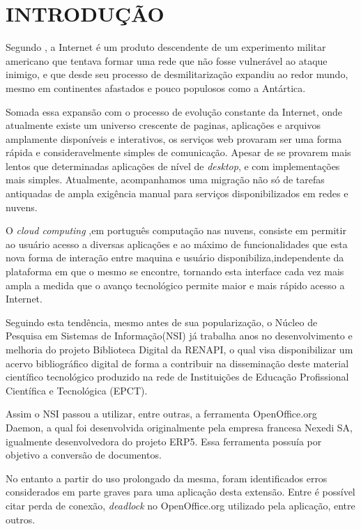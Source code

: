 \chapter{INTRODUÇÃO}

Segundo \cite{TESLA}, a Internet é um produto descendente de um experimento militar americano que tentava formar uma rede que não fosse vulnerável ao ataque inimigo, e que desde seu processo de desmilitarização expandiu ao redor mundo, mesmo em continentes afastados e pouco populosos como a Antártica.

Somada essa expansão com o processo de evolução constante da Internet, onde atualmente existe um universo crescente de paginas, aplicações e arquivos amplamente disponíveis e interativos, os serviços web provaram ser uma forma rápida e consideravelmente simples de comunicação. Apesar de se provarem mais lentos que determinadas aplicações de nível de \textit{desktop}, e com implementações mais simples. Atualmente, acompanhamos uma migração não só de tarefas antiquadas de ampla exigência manual para serviços disponibilizados em redes e nuvens.

O \textit{cloud computing} ,em português computação nas nuvens, consiste em permitir ao usuário acesso a diversas aplicações e ao máximo de funcionalidades que esta nova forma de interação entre maquina e usuário disponibiliza,independente da plataforma em que o mesmo se encontre, tornando esta interface cada vez mais ampla a medida que o avanço tecnológico permite maior e mais rápido acesso a Internet.

Seguindo esta tendência, mesmo antes de sua popularização, o Núcleo de Pesquisa em Sistemas de Informação(NSI) já trabalha anos no desenvolvimento e melhoria do projeto Biblioteca Digital da RENAPI, o qual visa disponibilizar um acervo bibliográfico digital de forma a contribuir na disseminação deste material científico tecnológico produzido na rede de Instituições de Educação Profissional Científica e Tecnológica (EPCT).

Assim o NSI passou a utilizar, entre outras, a ferramenta OpenOffice.org Daemon, a qual foi desenvolvida originalmente pela empresa francesa Nexedi SA, igualmente desenvolvedora do projeto ERP5. Essa ferramenta possuía por objetivo a conversão de documentos.

No entanto a partir do uso prolongado da mesma, foram identificados erros considerados em parte graves para uma aplicação desta extensão. Entre é possível citar perda de conexão, \textit{deadlock} no OpenOffice.org utilizado pela aplicação, entre outros.

